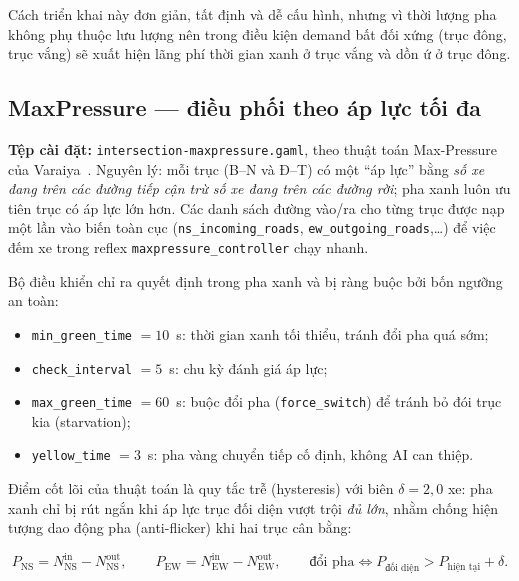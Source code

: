 \documentclass[11pt,a4paper]{article}
\begin{document}
Cách triển khai này đơn giản, tất định và dễ cấu hình, nhưng vì thời lượng pha
không phụ thuộc lưu lượng nên trong điều kiện demand bất đối xứng (trục đông,
trục vắng) sẽ xuất hiện lãng phí thời gian xanh ở trục vắng và dồn ứ ở trục đông.

\subsection{MaxPressure --- điều phối theo áp lực tối đa}

\textbf{Tệp cài đặt:} \texttt{intersection-maxpressure.gaml}, theo thuật toán
Max-Pressure của Varaiya~\cite{varaiya2013}. Nguyên lý: mỗi trục (B--N và Đ--T)
có một ``áp lực'' bằng \emph{số xe đang trên các đường tiếp cận trừ số xe đang trên
các đường rời}; pha xanh luôn ưu tiên trục có áp lực lớn hơn. Các danh sách đường
vào/ra cho từng trục được nạp một lần vào biến toàn cục
(\texttt{ns\_incoming\_roads}, \texttt{ew\_outgoing\_roads},\dots) để việc đếm xe
trong reflex \texttt{maxpressure\_controller} chạy nhanh.

Bộ điều khiển chỉ ra quyết định trong pha xanh và bị ràng buộc bởi bốn ngưỡng an toàn:

\begin{itemize}[leftmargin=*]
    \item \texttt{min\_green\_time} $= 10$~s: thời gian xanh tối thiểu, tránh đổi
    pha quá sớm;
    \item \texttt{check\_interval} $= 5$~s: chu kỳ đánh giá áp lực;
    \item \texttt{max\_green\_time} $= 60$~s: buộc đổi pha (\texttt{force\_switch})
    để tránh bỏ đói trục kia (starvation);
    \item \texttt{yellow\_time} $= 3$~s: pha vàng chuyển tiếp cố định, không AI
    can thiệp.
\end{itemize}

Điểm cốt lõi của thuật toán là quy tắc trễ (hysteresis) với biên $\delta = 2{,}0$ xe:
pha xanh chỉ bị rút ngắn khi áp lực trục đối diện vượt trội \emph{đủ lớn}, nhằm chống
hiện tượng dao động pha (anti-flicker) khi hai trục cân bằng:

\begin{equation}
P_{\text{NS}} = N^{\text{in}}_{\text{NS}} - N^{\text{out}}_{\text{NS}},
\qquad
P_{\text{EW}} = N^{\text{in}}_{\text{EW}} - N^{\text{out}}_{\text{EW}},
\qquad
\text{đổi pha} \iff P_{\text{đối diện}} > P_{\text{hiện tại}} + \delta .
\label{eq:maxpressure}
\end{equation}
\end{document}
